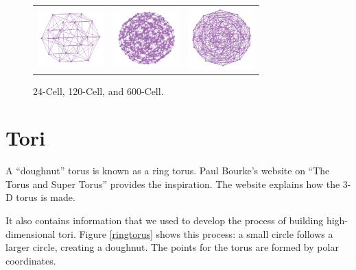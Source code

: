 \begin{figure}[ht]
\centering
\begin{tabular}{ccc}
\includegraphics[width=1.0in]{fig/24-cell.pdf}&\includegraphics[width=1in]{fig/120-cell.pdf}&\includegraphics[width=1in]{fig/600-cell.pdf}
\end{tabular}
\caption{24-Cell, 120-Cell, and 600-Cell.}
\label{polytope}
\end{figure}


\section{Tori}

A ``doughnut'' torus is known as a ring torus. Paul Bourke's website
\citep{Pa90} on ``The Torus and Super Torus'' provides the
inspiration. The website explains how the 3-D torus is made.

It also contains information that we used to develop the process of
building high-dimensional tori.  Figure \ref{ringtorus} shows this
process: a small circle follows a larger circle, creating a
doughnut. The points for the torus are formed by polar coordinates.

